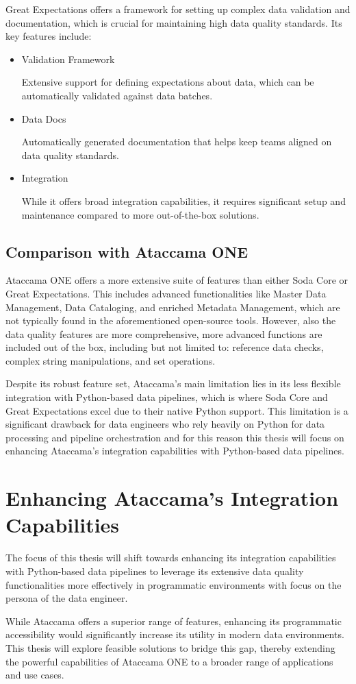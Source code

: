Great Expectations \cite{great_expectations} offers a framework for setting up complex data validation and documentation, which is crucial for maintaining high data quality standards. Its key features include:

\begin{itemize}
    \item   Validation Framework
    
    Extensive support for defining expectations about data, which can be automatically validated against data batches.

    \item Data Docs
    
    Automatically generated documentation that helps keep teams aligned on data quality standards.

    \item Integration
    
    While it offers broad integration capabilities, it requires significant setup and maintenance compared to more out-of-the-box solutions.
\end{itemize}


\subsection{Comparison with Ataccama ONE}

Ataccama ONE offers a more extensive suite of features than either Soda Core or Great Expectations. This includes advanced functionalities like Master Data Management, Data Cataloging, and enriched Metadata Management, which are not typically found in the aforementioned open-source tools. However, also the data quality features are more comprehensive, more advanced functions are included out of the box, including but not limited to: reference data checks, complex string manipulations, and set operations.

Despite its robust feature set, Ataccama’s main limitation lies in its less flexible integration with Python-based data pipelines, which is where Soda Core and Great Expectations excel due to their native Python support. This limitation is a significant drawback for data engineers who rely heavily on Python for data processing and pipeline orchestration and for this reason this thesis will focus on enhancing Ataccama's integration capabilities with Python-based data pipelines.

\section{Enhancing Ataccama's Integration Capabilities}

The focus of this thesis will shift towards enhancing its integration capabilities with Python-based data pipelines to leverage its extensive data quality functionalities more effectively in programmatic environments with focus on the persona of the data engineer.

While Ataccama offers a superior range of features, enhancing its programmatic accessibility would significantly increase its utility in modern data environments. This thesis will explore feasible solutions to bridge this gap, thereby extending the powerful capabilities of Ataccama ONE to a broader range of applications and use cases.
